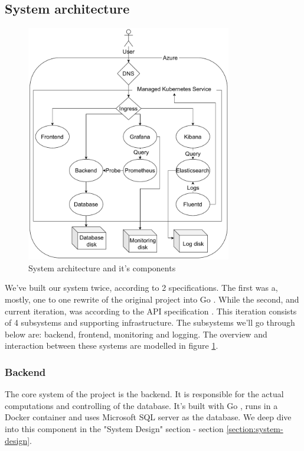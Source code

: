 \subsection{System architecture}
\begin{figure}[h]
    \centering
    \includegraphics[width=0.8\textwidth]{images/infrastructure.pdf}
    \caption{System architecture and it's components}
    \label{fig:architecture}
\end{figure}

We've built our system twice, according to 2 specifications. The first was a, mostly, one to one rewrite of the original project into Go \cite{tool:go}.
While the second, and current iteration, was according to the API specification \cite{spec:api}. 
This iteration consists of 4 subsystems and supporting infrastructure. The subsystems we'll go through below are: backend, frontend, monitoring and logging.
The overview and interaction between these systems are modelled in figure \ref{fig:architecture}.

\subsubsection{Backend}
The core system of the project is the backend. It is responsible for the actual computations and controlling of the database.
It's built with Go \cite{tool:go}, runs in a Docker container and uses Microsoft SQL server \cite{tool:microsoft-sql-server} as the database. We deep dive into this component in the "System Design" section - section \ref{section:system-design}.

